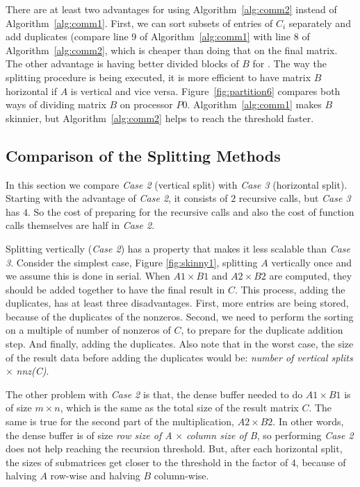There are at least two advantages for using Algorithm~\ref{alg:comm2} instead of Algorithm~\ref{alg:comm1}. First, we can sort subsets of entries of $C_i$ separately and add duplicates (compare line 9 of Algorithm~\ref{alg:comm1} with line $8$ of Algorithm~\ref{alg:comm2}, which is cheaper than doing that on the final matrix. The other advantage is having better divided blocks of $B$ for \recmm. The way the splitting procedure is being executed, it is more efficient to have matrix $B$ horizontal if $A$ is vertical and vice versa. Figure~\ref{fig:partition6} compares both ways of dividing matrix $B$ on processor $P0$. Algorithm~\ref{alg:comm1} makes $B$ skinnier, but Algorithm~\ref{alg:comm2} helps to reach the threshold faster.



\subsection{Comparison of the Splitting Methods}
\label{sec:compare}

In this section we compare \textit{Case 2} (vertical split) with \textit{Case 3} (horizontal split). Starting with the advantage of \textit{Case 2}, it consists of $2$ recursive calls, but \textit{Case 3} has $4$. So the cost of preparing for the recursive calls and also the cost of function calls themselves are half in \textit{Case 2}. 

Splitting vertically (\textit{Case 2}) has a property that makes it less scalable than \textit{Case 3}. Consider the simplest case, Figure \ref{fig:skinny1}, splitting $A$ vertically once and we assume this is done in serial. When $A1 \times B1$ and $A2 \times B2$ are computed, they should be added together to have the final result in $C$. This process, adding the duplicates, has at least three disadvantages. First, more entries are being stored, because of the duplicates of the nonzeros. Second, we need to perform the sorting on a multiple of number of nonzeros of $C$, to prepare for the duplicate addition step. And finally, adding the duplicates. Also note that in the worst case, the size of the result data before adding the duplicates would be: \textit{number of vertical splits} $\times$ \textit{nnz(C)}.  

The other problem with \textit{Case 2} is that, the dense buffer needed to do $A1 \times B1$ is of size $m \times n$, which is the same as the total size of the result matrix $C$. The same is true for the second part of the multiplication, $A2 \times B2$. In other words, the dense buffer is of size \textit{row size of A} $\times$ \textit{column size of B}, so performing \textit{Case 2} does not help reaching the recursion threshold.
But, after each horizontal split, the sizes of submatrices get closer to the threshold in the factor of $4$, because of halving $A$ row-wise and halving $B$ column-wise.

